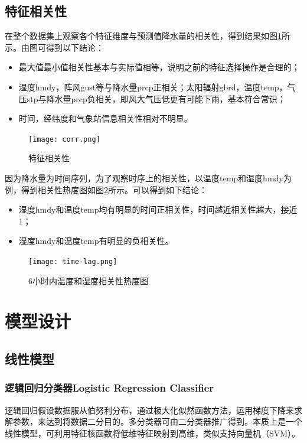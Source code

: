 \documentclass[UTF8]{ctexart}
\begin{document}
\subsection{特征相关性}
在整个数据集上观察各个特征维度与预测值降水量的相关性，得到结果如图\ref{fig:corr}所示。由图可得到以下结论：
\begin{itemize}
	\item 最大值最小值相关性基本与实际值相等，说明之前的特征选择操作是合理的；
	\item 湿度hmdy，阵风gust等与降水量prcp正相关；太阳辐射gbrd，温度temp，气压stp与降水量prcp负相关，即风大气压低更有可能下雨，基本符合常识；
	\item 时间，经纬度和气象站信息相关性相对不明显。
\end{itemize}


\begin{figure}[h] %
  \centering
  \texttt{[image: corr.png]}
  \caption{特征相关性}
  \label{fig:corr}
\end{figure}

因为降水量为时间序列，为了观察时序上的相关性，以温度temp和湿度hmdy为例，得到相关性热度图如图\ref{fig:timelag}所示。可以得到如下结论：
\begin{itemize}
	\item 湿度hmdy和温度temp均有明显的时间正相关性，时间越近相关性越大，接近1；
	\item 湿度hmdy和温度temp有明显的负相关性。
\end{itemize}

\begin{figure}[h] %
  \centering
  \texttt{[image: time-lag.png]}
  \caption{6小时内温度和湿度相关性热度图}
  \label{fig:timelag}
\end{figure}

\section{模型设计}
\label{sec:model design}
\subsection{线性模型}

\subsubsection{逻辑回归分类器Logistic Regression Classifier}

逻辑回归假设数据服从伯努利分布，通过极大化似然函数方法，运用梯度下降来求解参数，来达到将数据二分目的。多分类器可由二分类器推广得到。本质上是一个线性模型，可利用特征核函数将低维特征映射到高维，类似支持向量机（SVM）。
\end{document}
